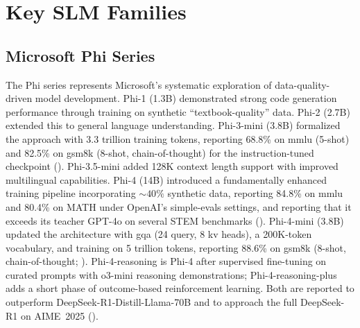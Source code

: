 
\section{Key SLM Families}
\label{supp:families}

\subsection{Microsoft Phi Series}
\label{subsubsec:phi_series}
The Phi series represents Microsoft's systematic exploration of data-quality-driven model development. Phi-1 (1.3B) \citep{gunasekar2023phi1} demonstrated strong code generation performance through training on synthetic ``textbook-quality'' data. Phi-2 (2.7B) \citep{microsoft2023phi2} extended this to general language understanding. Phi-3-mini (3.8B) \citep{abdin2024phi3} formalized the approach with 3.3 trillion training tokens, reporting 68.8\% on \gls{mmlu} (5-shot) and 82.5\% on \gls{gsm8k} (8-shot, chain-of-thought) for the instruction-tuned checkpoint (\evC). Phi-3.5-mini \citep{abdin2024phi35} added 128K context length support with improved multilingual capabilities. Phi-4 (14B) \citep{abdin2024phi4} introduced a fundamentally enhanced training pipeline incorporating ${\sim}40\%$ synthetic data, reporting 84.8\% on \gls{mmlu} and 80.4\% on MATH under OpenAI's simple-evals settings, and reporting that it exceeds its teacher GPT-4o on several STEM benchmarks (\evC). Phi-4-mini (3.8B) \citep{microsoft2025phi4mini} updated the architecture with \gls{gqa} (24 query, 8 \gls{kv} heads), a 200K-token vocabulary, and training on 5 trillion tokens, reporting 88.6\% on \gls{gsm8k} (8-shot, chain-of-thought; \evC). Phi-4-reasoning \citep{abdin2025phi4reasoning} is Phi-4 after supervised fine-tuning on curated prompts with o3-mini reasoning demonstrations; Phi-4-reasoning-plus adds a short phase of outcome-based reinforcement learning. Both are reported to outperform DeepSeek-R1-Distill-Llama-70B and to approach the full DeepSeek-R1 on AIME~2025 (\evC).

